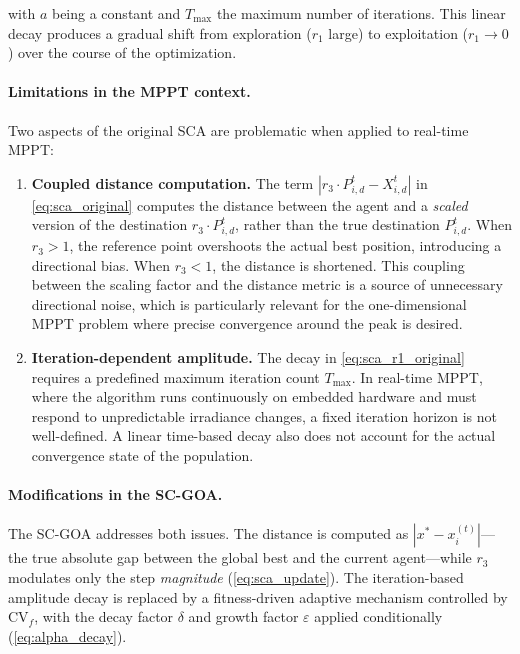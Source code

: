 \documentclass[a4paper, 12pt]{article}
\begin{document}
with $a$ being a constant and $T_{\max}$ the maximum number of iterations. This linear decay produces a gradual shift from exploration ($r_1$ large) to exploitation ($r_1 \to 0$) over the course of the optimization.

\paragraph{Limitations in the MPPT context.}
Two aspects of the original SCA are problematic when applied to real-time MPPT:

\begin{enumerate}[label=(\roman*)]
    \item \textbf{Coupled distance computation.} The term $|r_3 \cdot P_{i,d}^{t} - X_{i,d}^{t}|$ in \cref{eq:sca_original} computes the distance between the agent and a \emph{scaled} version of the destination $r_3 \cdot P_{i,d}^{t}$, rather than the true destination $P_{i,d}^{t}$. When $r_3 > 1$, the reference point overshoots the actual best position, introducing a directional bias. When $r_3 < 1$, the distance is shortened. This coupling between the scaling factor and the distance metric is a source of unnecessary directional noise, which is particularly relevant for the one-dimensional MPPT problem where precise convergence around the peak is desired.

    \item \textbf{Iteration-dependent amplitude.} The decay in \cref{eq:sca_r1_original} requires a predefined maximum iteration count $T_{\max}$. In real-time MPPT, where the algorithm runs continuously on embedded hardware and must respond to unpredictable irradiance changes, a fixed iteration horizon is not well-defined. A linear time-based decay also does not account for the actual convergence state of the population.
\end{enumerate}

\paragraph{Modifications in the SC-GOA.}
The SC-GOA addresses both issues. The distance is computed as $|x^{*} - x_i^{(t)}|$---the true absolute gap between the global best and the current agent---while $r_3$ modulates only the step \emph{magnitude} (\cref{eq:sca_update}). The iteration-based amplitude decay is replaced by a fitness-driven adaptive mechanism controlled by $\mathrm{CV}_f$, with the decay factor $\delta$ and growth factor $\varepsilon$ applied conditionally (\cref{eq:alpha_decay}).
\end{document}
